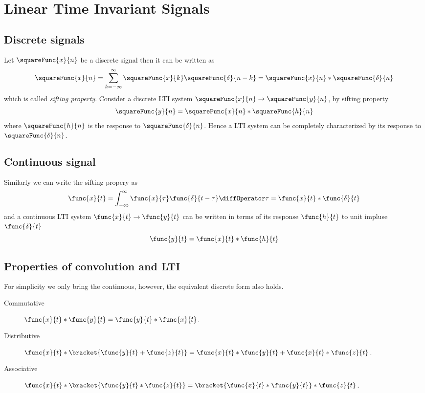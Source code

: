 \chapter{Linear Time Invariant Signals}
\section{Discrete signals}
Let \(\squareFunc{x}{n}\) be a discrete signal then it can be written as
\begin{equation*}
    \squareFunc{x}{n} = \sum_{k = -\infty}^{\infty} \squareFunc{x}{k} \squareFunc{\delta}{n -k} = \squareFunc{x}{n} \ast \squareFunc{\delta}{n}
\end{equation*}
which is called \textit{sifting property}. Consider a discrete LTI system \(\squareFunc{x}{n} \to \squareFunc{y}{n}\), by sifting property
\begin{equation*}
    \squareFunc{y}{n} = \squareFunc{x}{n} \ast \squareFunc{h}{n}
\end{equation*}
where \(\squareFunc{h}{n}\) is the response to \(\squareFunc{\delta}{n}\). Hence a LTI system can be completely characterized by its response to \(\squareFunc{\delta}{n}\).

\section{Continuous signal}
Similarly we can write the sifting propery as 
\begin{equation*}
    \func{x}{t} = \int_{-\infty}^{\infty} \func{x}{\tau} \func{\delta}{t - \tau} \diffOperator \tau = \func{x}{t} \ast \func{\delta}{t}
\end{equation*}
and a continuous LTI system \(\func{x}{t} \to \func{y}{t}\) can be written in terms of its response \(\func{h}{t}\) to unit impluse \(\func{\delta}{t}\)
\begin{equation*}
    \func{y}{t} = \func{x}{t} \ast \func{h}{t}
\end{equation*}

\section{Properties of convolution and LTI}
For simplicity we only bring the continuous, however, the equivalent discrete form also holds.
\begin{description}
    \item [Commutative] \(\func{x}{t} \ast \func{y}{t} = \func{y}{t}\ast \func{x}{t}\).
    \item [Distributive] \(\func{x}{t} \ast \bracket{\func{y}{t} + \func{z}{t}} = \func{x}{t}\ast \func{y}{t} + \func{x}{t}\ast \func{z}{t}\).
    \item [Associative] \(\func{x}{t} \ast \bracket{\func{y}{t} \ast \func{z}{t}} = \bracket{\func{x}{t} \ast \func{y}{t}} \ast \func{z}{t}\).
\end{description}


